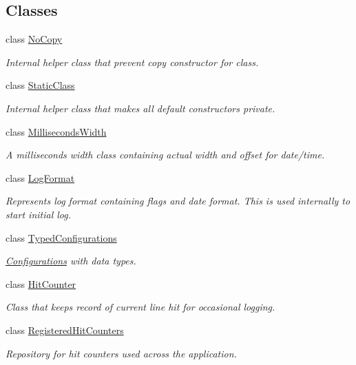 \subsection*{Classes}
\begin{DoxyCompactItemize}
\item 
class \hyperlink{classel_1_1base_1_1NoCopy}{No\-Copy}
\begin{DoxyCompactList}\small\item\em Internal helper class that prevent copy constructor for class. \end{DoxyCompactList}\item 
class \hyperlink{classel_1_1base_1_1StaticClass}{Static\-Class}
\begin{DoxyCompactList}\small\item\em Internal helper class that makes all default constructors private. \end{DoxyCompactList}\item 
class \hyperlink{classel_1_1base_1_1MillisecondsWidth}{Milliseconds\-Width}
\begin{DoxyCompactList}\small\item\em A milliseconds width class containing actual width and offset for date/time. \end{DoxyCompactList}\item 
class \hyperlink{classel_1_1base_1_1LogFormat}{Log\-Format}
\begin{DoxyCompactList}\small\item\em Represents log format containing flags and date format. This is used internally to start initial log. \end{DoxyCompactList}\item 
class \hyperlink{classel_1_1base_1_1TypedConfigurations}{Typed\-Configurations}
\begin{DoxyCompactList}\small\item\em \hyperlink{classel_1_1Configurations}{Configurations} with data types. \end{DoxyCompactList}\item 
class \hyperlink{classel_1_1base_1_1HitCounter}{Hit\-Counter}
\begin{DoxyCompactList}\small\item\em Class that keeps record of current line hit for occasional logging. \end{DoxyCompactList}\item 
class \hyperlink{classel_1_1base_1_1RegisteredHitCounters}{Registered\-Hit\-Counters}
\begin{DoxyCompactList}\small\item\em Repository for hit counters used across the application. \end{DoxyCompactList}\item 

\end{DoxyCompactItemize}
